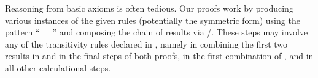 \begin{isabellebody}
\isanewline
{}\isamarkupfalse%
%
\endisatagproof
{\isafoldproof}%
%
\isadelimproof
%
\endisadelimproof
%
\begin{isamarkuptext}%
Reasoning from basic axioms is often tedious.  Our proofs work by
  producing various instances of the given rules (potentially the
  symmetric form) using the pattern ``\hyperlink{command.have}{\mbox{}}~~\hyperlink{command.by}{\mbox{}}~'' and composing the chain of
  results via \hyperlink{command.also}{\mbox{}}/\hyperlink{command.finally}{\mbox{}}.  These steps may
  involve any of the transitivity rules declared in
  , namely  in combining
  the first two results in  and in the final steps of
  both proofs,  in the first combination of , and  in all other calculational steps.


\end{isamarkuptext}
\end{isabellebody}
